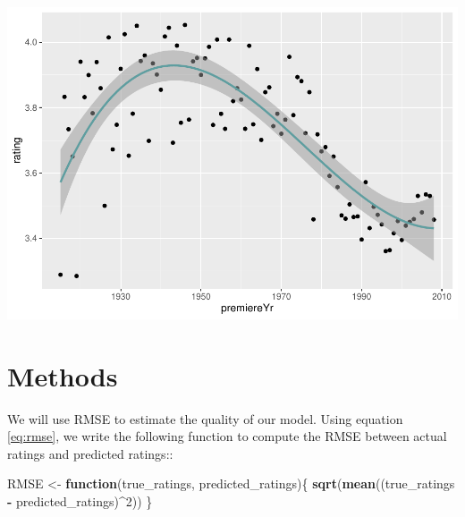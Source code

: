 \documentclass[]{article}
\newenvironment{Shaded}{\begin{snugshade}}{\end{snugshade}}
\newcommand{\ControlFlowTok}[1]{\textcolor[rgb]{0.13,0.29,0.53}{\textbf{#1}}}
\newcommand{\DataTypeTok}[1]{\textcolor[rgb]{0.13,0.29,0.53}{#1}}
\newcommand{\DecValTok}[1]{\textcolor[rgb]{0.00,0.00,0.81}{#1}}
\newcommand{\FloatTok}[1]{\textcolor[rgb]{0.00,0.00,0.81}{#1}}
\newcommand{\KeywordTok}[1]{\textcolor[rgb]{0.13,0.29,0.53}{\textbf{#1}}}
\newcommand{\NormalTok}[1]{#1}
\newcommand{\OperatorTok}[1]{\textcolor[rgb]{0.81,0.36,0.00}{\textbf{#1}}}
\newcommand{\StringTok}[1]{\textcolor[rgb]{0.31,0.60,0.02}{#1}}
\begin{document}
\begin{Shaded}
\end{Shaded}

\includegraphics{Project_MovieLens_files/figure-latex/unnamed-chunk-19-1.pdf}

\section{Methods}
\label{sec:methods}

We will use RMSE to estimate the quality of our model. Using equation
\ref{eq:rmse}, we write the following function to compute the RMSE
between actual ratings and predicted ratings::

\begin{Shaded}
\begin{Highlighting}[]
\NormalTok{RMSE <-}\StringTok{ }\ControlFlowTok{function}\NormalTok{(true_ratings, predicted_ratings)\{}
  \KeywordTok{sqrt}\NormalTok{(}\KeywordTok{mean}\NormalTok{((true_ratings }\OperatorTok{-}\StringTok{ }\NormalTok{predicted_ratings)}\OperatorTok{^}\DecValTok{2}\NormalTok{))}
\NormalTok{\}}
\end{Highlighting}
\end{Shaded}
\end{document}

